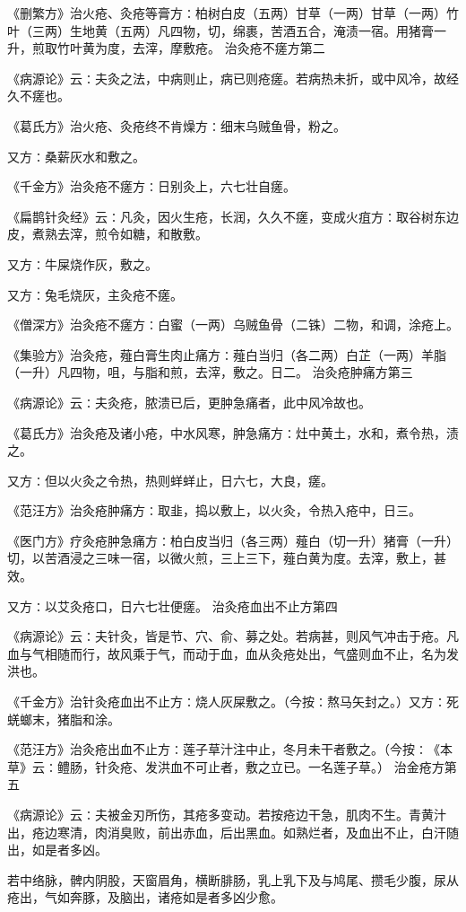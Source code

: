 \documentclass[a4paper,12pt,UTF8,twoside]{ctexbook}
\begin{document}
《删繁方》治火疮、灸疮等膏方∶柏树白皮（五两）甘草（一两）甘草（一两）竹叶（三两）生地黄（五两）凡四物，切，绵裹，苦酒五合，淹渍一宿。用猪膏一升，煎取竹叶黄为度，去滓，摩敷疮。
治灸疮不瘥方第二

《病源论》云∶夫灸之法，中病则止，病已则疮瘥。若病热未折，或中风冷，故经久不瘥也。

《葛氏方》治火疮、灸疮终不肯燥方∶细末乌贼鱼骨，粉之。

又方∶桑薪灰水和敷之。

《千金方》治灸疮不瘥方∶日别灸上，六七壮自瘥。

《扁鹊针灸经》云∶凡灸，因火生疮，长润，久久不瘥，变成火疽方∶取谷树东边皮，煮熟去滓，煎令如糖，和散敷。

又方∶牛屎烧作灰，敷之。

又方∶兔毛烧灰，主灸疮不瘥。

《僧深方》治灸疮不瘥方∶白蜜（一两）乌贼鱼骨（二铢）二物，和调，涂疮上。

《集验方》治灸疮，薤白膏生肉止痛方∶薤白当归（各二两）白芷（一两）羊脂（一升）凡四物，咀，与脂和煎，去滓，敷之。日二。
治灸疮肿痛方第三

《病源论》云∶夫灸疮，脓溃已后，更肿急痛者，此中风冷故也。

《葛氏方》治灸疮及诸小疮，中水风寒，肿急痛方∶灶中黄土，水和，煮令热，渍之。

又方∶但以火灸之令热，热则蛘蛘止，日六七，大良，瘥。

《范汪方》治灸疮肿痛方∶取韭，捣以敷上，以火灸，令热入疮中，日三。

《医门方》疗灸疮肿急痛方∶柏白皮当归（各三两）薤白（切一升）猪膏（一升）切，以苦酒浸之三味一宿，以微火煎，三上三下，薤白黄为度。去滓，敷上，甚效。

又方∶以艾灸疮口，日六七壮便瘥。
治灸疮血出不止方第四

《病源论》云∶夫针灸，皆是节、穴、俞、募之处。若病甚，则风气冲击于疮。凡血与气相随而行，故风乘于气，而动于血，血从灸疮处出，气盛则血不止，名为发洪也。

《千金方》治针灸疮血出不止方∶烧人灰屎敷之。（今按∶熬马矢封之。）又方∶死蜣螂末，猪脂和涂。

《范汪方》治灸疮出血不止方∶莲子草汁注中止，冬月未干者敷之。（今按∶《本草》云∶鳢肠，针灸疮、发洪血不可止者，敷之立已。一名莲子草。）
治金疮方第五

《病源论》云∶夫被金刃所伤，其疮多变动。若按疮边干急，肌肉不生。青黄汁出，疮边寒清，肉消臭败，前出赤血，后出黑血。如熟烂者，及血出不止，白汗随出，如是者多凶。

若中络脉，髀内阴股，天窗眉角，横断腓肠，乳上乳下及与鸠尾、攒毛少腹，尿从疮出，气如奔豚，及脑出，诸疮如是者多凶少愈。
\end{document}
